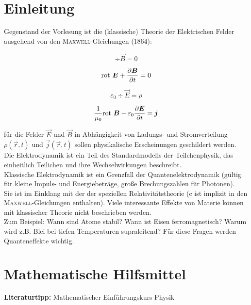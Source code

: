 \chapter{Einleitung}
Gegenstand der Vorlesung ist die (klassische) Theorie der Elektrischen Felder ausgehend von den \textsc{Maxwell}-Gleichungen (1864):

\begin{equation*}
\div \vec{B}=0
\end{equation*}

\begin{equation*}
\text{rot }  \bm{E}+\frac{\partial{\bm{B}}}{\partial{t}}=0
\end{equation*}

\begin{equation*}
\varepsilon_0\div \vec{E}=\rho
\end{equation*}

\begin{equation*}
\frac{1}{\mu_0}\text{rot } \bm{B}-\varepsilon_0\frac{\partial{\bm{E}}}{\partial{t}}=\bm{j}
\end{equation*}

für die Felder $\vec{E}$ und $\vec{B}$ in Abhängigkeit von Ladungs- und Stromverteilung $\rho(\vec{r},t)$ und $\vec{j}(\vec{r},t)$  sollen physikalische Erscheinungen geschildert werden.\\
Die Elektrodynamik ist ein Teil des Standardmodells der Teilchenphysik, das einheitlich Teilichen und ihre Wechselwirkungen beschreibt.\\
Klassische Elektrodynamik ist ein Grenzfall der Quantenelektrodynamik (gültig für kleine Impuls- und Energiebeträge, große Brechungszahlen für Photonen).\\
Sie ist im Einklang mit der der speziellen Relativitätstheorie (c ist implizit in den \textsc{Maxwell}-Gleichungen enthalten). Viele interessante Effekte von Materie können mit klassischer Theorie nicht beschrieben werden.\\
Zum Beispiel: Wann sind Atome stabil? Wann ist Eisen ferromagnetisch? Warum wird z.B. Blei bei tiefen Temperaturen supraleitend? Für diese Fragen werden Quanteneffekte wichtig.

\chapter{Mathematische Hilfsmittel}
\textbf{Literaturtipp:} Mathematischer Einführungskurs Physik\\
\linebreak

